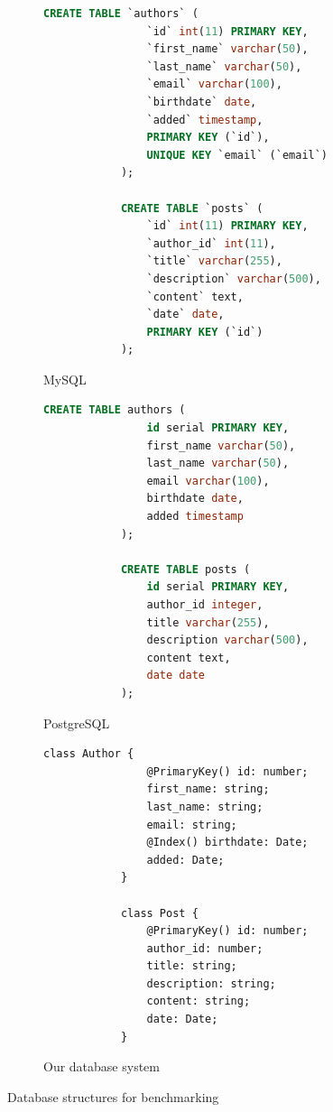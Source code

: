 \begin{figure}[h]
    \begin{subfigure}[t]{.3\textwidth}
        \begin{lstlisting}[language=SQL,basicstyle=\tiny]
            CREATE TABLE `authors` (
                `id` int(11) PRIMARY KEY,
                `first_name` varchar(50),
                `last_name` varchar(50),
                `email` varchar(100),
                `birthdate` date,
                `added` timestamp,
                PRIMARY KEY (`id`),
                UNIQUE KEY `email` (`email`)
            );

            CREATE TABLE `posts` (
                `id` int(11) PRIMARY KEY,
                `author_id` int(11),
                `title` varchar(255),
                `description` varchar(500),
                `content` text,
                `date` date,
                PRIMARY KEY (`id`)
            );
        \end{lstlisting}
        \caption{MySQL}
    \end{subfigure}%
    \begin{subfigure}[t]{.3\textwidth}
        \begin{lstlisting}[language=SQL,basicstyle=\tiny]
            CREATE TABLE authors (
                id serial PRIMARY KEY,
                first_name varchar(50),
                last_name varchar(50),
                email varchar(100),
                birthdate date,
                added timestamp
            );

            CREATE TABLE posts (
                id serial PRIMARY KEY,
                author_id integer,
                title varchar(255),
                description varchar(500),
                content text,
                date date
            );
        \end{lstlisting}
        \caption{PostgreSQL}
    \end{subfigure}
    \begin{subfigure}[t]{.4\textwidth}
        \begin{lstlisting}[style=ES6,basicstyle=\tiny]
            class Author {
                @PrimaryKey() id: number;
                first_name: string;
                last_name: string;
                email: string;
                @Index() birthdate: Date;
                added: Date;
            }

            class Post {
                @PrimaryKey() id: number;
                author_id: number;
                title: string;
                description: string;
                content: string;
                date: Date;
            }
        \end{lstlisting}
        \caption{Our database system}
    \end{subfigure}
    \caption{Database structures for benchmarking}
    \label{benchDatabaseStructure}
\end{figure}


